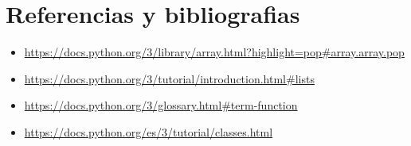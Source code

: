 \documentclass[]{article}
\begin{document}
    \section{Referencias y bibliografias}
    	\begin{itemize}		
    		\item \url{https://docs.python.org/3/library/array.html?highlight=pop#array.array.pop}
    		\item \url{https://docs.python.org/3/tutorial/introduction.html#lists}
    		\item 
            \url{https://docs.python.org/3/glossary.html#term-function}
            \item \url{https://docs.python.org/es/3/tutorial/classes.html}
    	\end{itemize}
     
\end{document}
